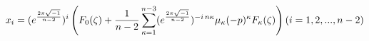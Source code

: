 \begin{equation}
x_{i}=
(e^{{\frac{2\pi\sqrt{-1}}{n-2}}})^{i}\left(F_{0}(\zeta)+\frac{1}{n-2}
\sum_{\kappa=1}^{n-3} (e^{{\frac{2\pi\sqrt{-1}}{n-2}}})
^{-i\,n\kappa}\mu_{\kappa} (-p)^{\kappa} F_{\kappa}(\zeta)\right)\\\\
\\ (i=1,2,...,n-2) \label{sol1}
\end{equation}

